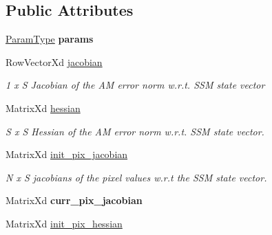 \subsection*{Public Attributes}
\begin{DoxyCompactItemize}
\item 
\hypertarget{classIALK2_af42772e069e1cb89bd849eb9b9dac21f}{\hyperlink{structIALK2Params}{Param\-Type} {\bfseries params}}\label{classIALK2_af42772e069e1cb89bd849eb9b9dac21f}

\item 
\hypertarget{classIALK2_a3b8688db64e652e1812953e6a9e103da}{Row\-Vector\-Xd \hyperlink{classIALK2_a3b8688db64e652e1812953e6a9e103da}{jacobian}}\label{classIALK2_a3b8688db64e652e1812953e6a9e103da}

\begin{DoxyCompactList}\small\item\em 1 x S Jacobian of the A\-M error norm w.\-r.\-t. S\-S\-M state vector \end{DoxyCompactList}\item 
\hypertarget{classIALK2_af0bae2ddd35a1a773f27de5bb30b64e1}{Matrix\-Xd \hyperlink{classIALK2_af0bae2ddd35a1a773f27de5bb30b64e1}{hessian}}\label{classIALK2_af0bae2ddd35a1a773f27de5bb30b64e1}

\begin{DoxyCompactList}\small\item\em S x S Hessian of the A\-M error norm w.\-r.\-t. S\-S\-M state vector. \end{DoxyCompactList}\item 
\hypertarget{classIALK2_a75785853d6458e94213451095324d061}{Matrix\-Xd \hyperlink{classIALK2_a75785853d6458e94213451095324d061}{init\-\_\-pix\-\_\-jacobian}}\label{classIALK2_a75785853d6458e94213451095324d061}

\begin{DoxyCompactList}\small\item\em N x S jacobians of the pixel values w.\-r.\-t the S\-S\-M state vector. \end{DoxyCompactList}\item 
\hypertarget{classIALK2_ab6507033c73d5f4c53103389772f0bf7}{Matrix\-Xd {\bfseries curr\-\_\-pix\-\_\-jacobian}}\label{classIALK2_ab6507033c73d5f4c53103389772f0bf7}

\item 
\hypertarget{classIALK2_a5eac5510857a25408c1e903b4f4f36ac}{Matrix\-Xd \hyperlink{classIALK2_a5eac5510857a25408c1e903b4f4f36ac}{init\-\_\-pix\-\_\-hessian}}\label{classIALK2_a5eac5510857a25408c1e903b4f4f36ac}


\end{DoxyCompactItemize}
